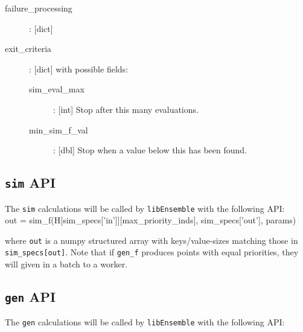 \documentclass{article}
\newenvironment{allintypewriter}{\ttfamily}{\par}
\newcommand{\libE}{\texttt{libEnsemble}\xspace}
\begin{document}
\begin{allintypewriter}
\begin{description}
    \item[failure\_processing]: [dict]

    \item[exit\_criteria]: [dict] with possible fields:
      \begin{description}
        \item[sim\_eval\_max]: [int] Stop after this many evaluations.
        \item[min\_sim\_f\_val]: [dbl] Stop when a value below this has been found.
      \end{description}


  \end{description}
\end{allintypewriter}

\subsection{\texttt{sim} API}
The \texttt{sim} calculations will be called by \libE with the following API:\\

\begin{allintypewriter}
  out = sim\_f(H[sim\_specs['in']][max\_priority\_inds], sim\_specs['out'],
  params)\\
\end{allintypewriter}

where \texttt{out} is a numpy structured array with keys/value-sizes matching
those in \texttt{sim\_specs[out]}. Note that if \texttt{gen\_f} produces points
with equal priorities, they will given in a batch to a worker.

\subsection{\texttt{gen} API}
The \texttt{gen} calculations will be called by \libE with the following API:\\
\end{document}
